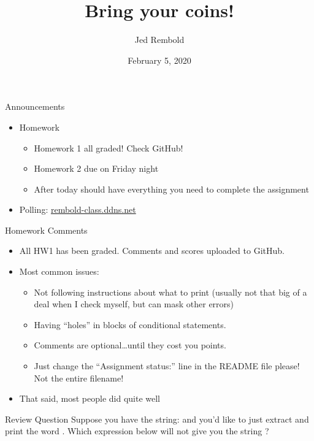 \documentclass[pdf, aspectratio=169, 12pt]{beamer}
\title{Bring your coins!}
\author{Jed Rembold}
\date{February 5, 2020}
\begin{document}
\begin{frame}{Announcements}
	\begin{itemize}
		\item Homework
			\begin{itemize}
				\item Homework 1 all graded! Check GitHub!
				\item Homework 2 due on Friday night
				\item After today should have everything you need to complete the assignment
			\end{itemize}
		\item Polling: \url{rembold-class.ddns.net}
	\end{itemize}
\end{frame}

\begin{frame}{Homework Comments}
	\begin{itemize}
		\item All HW1 has been graded. Comments and scores uploaded to GitHub.
		\item Most common issues:
			\begin{itemize}
				\item Not following instructions about what to print (usually not that big of a deal when I check myself, but can mask other errors)
				\item Having ``holes'' in blocks of conditional statements.
				\item Comments are optional\ldots until they cost you points.
				\item Just change the ``Assignment status:'' line in the README file please! Not the entire filename!
			\end{itemize}
		\item That said, most people did quite well
	\end{itemize}
\end{frame}

\begin{frame}[fragile]{Review Question}
	Suppose you have the string:  and you'd like to just extract and print the word . Which expression below will \alert{not} give you the string ?

	\begin{poll}
	\item {}
	\item {}
	\item {}
	\item {}
	\end{poll}
\end{frame}
\end{document}
